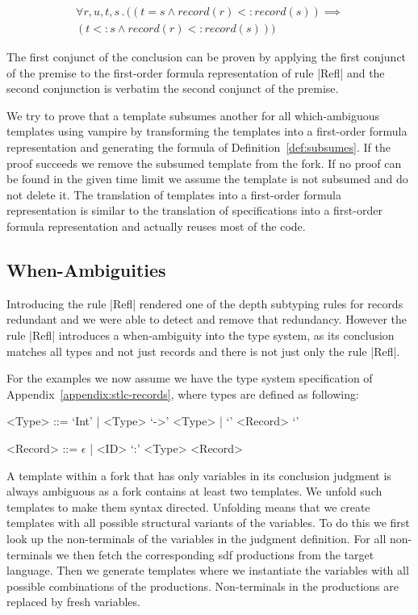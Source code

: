 \begin{multline}
  \forall r,u,t,s \,.\, ((t = s \land record(r) <: record(s)) \implies
  \\ (t <: s \land record(r) <: record(s)))
\end{multline}

The first conjunct of the conclusion can be proven by applying the
first conjunct of the premise to the first-order formula
representation of rule \code|Refl| and the second conjunction is
verbatim the second conjunct of the premise.

We try to prove that a template subsumes another for all
which-ambiguous templates using vampire by transforming the templates
into a first-order formula representation and generating the formula
of Definition~\ref{def:subsumes}. If the proof succeeds we remove the
subsumed template from the fork. If no proof can be found in the given
time limit we assume the template is not subsumed and do not delete
it. The translation of templates into a first-order formula
representation is similar to the translation of specifications into a
first-order formula representation and actually reuses most of the
code.

\subsection{When-Ambiguities}
Introducing the rule \code|Refl| rendered one of the depth subtyping
rules for records redundant and we were able to detect and remove that
redundancy. However the rule \code|Refl| introduces a when-ambiguity
into the type system, as its conclusion matches all types and not just
records and there is not just only the rule \code|Refl|.

For the examples we now assume we have the type system specification
of Appendix~\ref{appendix:stlc-records}, where types are defined as
following:

\begin{grammar}
  <Type> ::= `Int' | <Type> `->' <Type> | `{' <Record> `}'

  <Record> ::= $\epsilon$ | <ID> `:' <Type> <Record>
\end{grammar}

A template within a fork that has only variables in its conclusion
judgment is always ambiguous as a fork contains at least two
templates. We unfold such templates to make them syntax
directed. Unfolding means that we create templates with all possible
structural variants of the variables. To do this we first look up the
non-terminals of the variables in the judgment definition. For all
non-terminals we then fetch the corresponding \gls{sdf} productions
from the target language. Then we generate templates where we
instantiate the variables with all possible combinations of the
productions. Non-terminals in the productions are replaced by fresh
variables.

